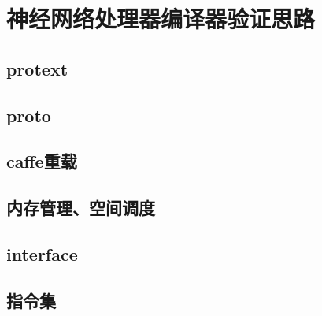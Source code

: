 \chapter{神经网络处理器编译器验证思路}

\section{protext}

\section{proto}

\section{caffe重载}

\section{内存管理、空间调度}

\section{interface}

\section{指令集}